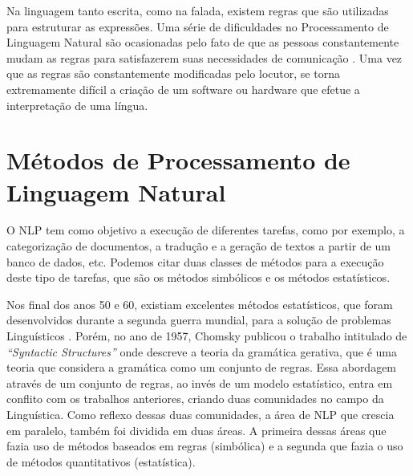 Na linguagem tanto escrita, como na falada, existem regras que são utilizadas
para estruturar as expressões. Uma série de dificuldades no Processamento de
Linguagem Natural são ocasionadas pelo fato de que as pessoas constantemente
mudam as regras para satisfazerem suas necessidades de comunicação
\cite{manningschutze1999}. Uma vez que as regras são constantemente modificadas
pelo locutor, se torna extremamente difícil a criação de um software ou hardware
que efetue a interpretação de uma língua.


%
%
%

\section{Métodos de Processamento de Linguagem Natural}

O \ac{NLP} tem como objetivo a execução de diferentes tarefas, como por exemplo,
a categorização de documentos, a tradução e a geração de textos a partir de um
banco de dados, etc. Podemos citar duas classes de métodos para a execução deste
tipo de tarefas, que são os métodos simbólicos e os métodos estatísticos.

Nos final dos anos 50 e 60, existiam excelentes métodos estatísticos, que foram
desenvolvidos durante a segunda guerra mundial, para a solução de problemas
Linguísticos \cite{shannon48}.
Porém, no ano de 1957, Chomsky publicou o trabalho intitulado de
\textit{``Syntactic Structures''} onde descreve a
teoria da gramática gerativa, que é uma teoria que considera a
gramática como um conjunto de regras. Essa abordagem através de um conjunto de
regras, ao invés de um modelo estatístico, entra em conflito com os trabalhos
anteriores, criando duas comunidades no campo da Linguística. Como reflexo
dessas duas comunidades, a área de \ac{NLP} que crescia em paralelo, também foi
dividida em duas áreas. A primeira dessas áreas que fazia uso de métodos
baseados em regras (simbólica) e a segunda que fazia o uso de métodos quantitativos (estatística).


